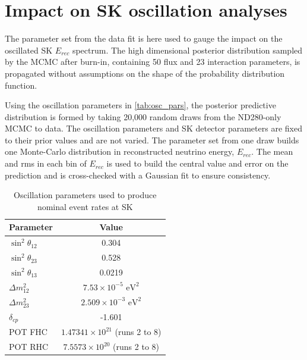 \section{Impact on SK oscillation analyses}
The parameter set from the data fit is here used to gauge the impact on the oscillated SK $E_{rec}$ spectrum. The high dimensional posterior distribution sampled by the MCMC after burn-in, containing 50 flux and 23 interaction parameters, is propagated without assumptions on the shape of the probability distribution function.

Using the oscillation parameters in \autoref{tab:osc_pars}, the posterior predictive distribution is formed by taking 20,000 random draws from the ND280-only MCMC to data. The oscillation parameters and SK detector parameters are fixed to their prior values and are not varied. The parameter set from one draw builds one Monte-Carlo distribution in reconstructed neutrino energy, $E_{rec}$. The mean and rms in each bin of $E_{rec}$ is used to build the central value and error on the prediction and is cross-checked with a Gaussian fit to ensure consistency.
\begin{table}[h]
	\begin{tabular}{l | c}
		\hline
		\hline
		Parameter & Value \\
		\hline
		$\sin^2\theta_{12}$ & 0.304 \\
		$\sin^2\theta_{23}$ & 0.528 \\
		$\sin^2\theta_{13}$ & 0.0219 \\
		$\Delta m^2_{12}$  & $7.53\times10^{-5} \text{ eV}^2$ \\
		$\Delta m^2_{23}$  & $2.509\times10^{-3} \text{ eV}^2$ \\
		$\delta_{cp}$ & -1.601 \\
		\hline
		POT FHC & $1.47341\times10^{21}$ (runs 2 to 8)\\ 
		POT RHC & $7.5573\times10^{20}$ (runs 2 to 8)\\
		\hline
		\hline
	\end{tabular}
\caption{Oscillation parameters used to produce nominal event rates at SK}
\label{tab:osc_pars}
\end{table}

